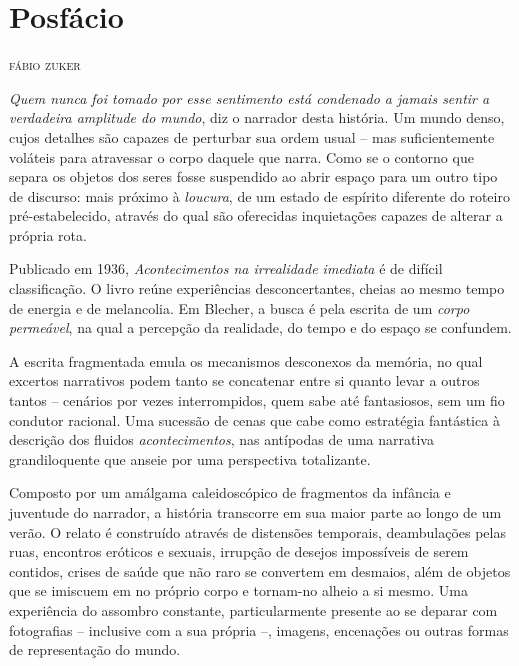 \newcommand{\subtitulo}[1]{\NoCaseChange{\textnormal{\break\Large\itshape#1}}}
\chapter*{Posfácio\smallskip\subtitulo{O instável mundo de Max Blecher}}

\begin{flushright}
\textsc{fábio zuker}
\end{flushright}

\noindent\textit{Quem nunca foi tomado por esse sentimento está condenado a jamais sentir a verdadeira amplitude do mundo}, diz o narrador desta história. Um mundo  denso, cujos detalhes são capazes de perturbar sua ordem usual -- mas suficientemente voláteis para atravessar o corpo daquele que narra. Como se o contorno que separa os objetos dos seres fosse suspendido ao abrir espaço para um outro tipo de discurso: mais próximo à \textit{loucura}, de um estado de espírito diferente do roteiro pré-estabelecido, através do qual são oferecidas inquietações capazes de alterar a própria rota.

Publicado em 1936, \textit{Acontecimentos na irrealidade imediata} é de difícil classificação. O livro reúne experiências desconcertantes, cheias ao mesmo tempo de energia e de melancolia. Em Blecher, a busca é pela escrita de um \textit{corpo permeável}, na qual a percepção da realidade, do tempo e do espaço se confundem. 

A escrita fragmentada emula os mecanismos desconexos da memória, no qual excertos narrativos podem tanto se concatenar entre si quanto levar a outros tantos -- cenários por vezes interrompidos, quem sabe até fantasiosos, sem um fio condutor racional. Uma sucessão de cenas que cabe como estratégia fantástica à descrição dos fluidos \textit{acontecimentos}, nas antípodas de uma narrativa grandiloquente que anseie por uma perspectiva totalizante.

Composto por um amálgama caleidoscópico de fragmentos da infância e juventude do narrador, a história transcorre em sua maior parte ao longo de um verão. O relato é construído através de distensões temporais, deambulações pelas ruas, encontros eróticos e sexuais, irrupção de desejos impossíveis de serem contidos, crises de saúde que não raro se convertem em desmaios, além de objetos que se imiscuem em no próprio corpo e tornam-no alheio a si mesmo. Uma experiência do assombro constante, particularmente presente ao se deparar com fotografias -- inclusive com a sua própria --, imagens, encenações ou outras formas de representação do mundo.

